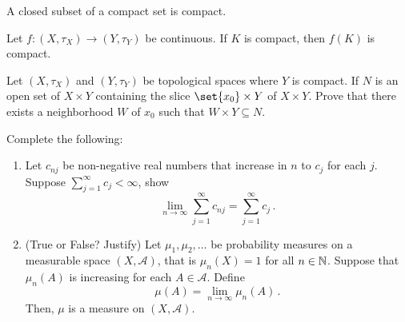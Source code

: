 \documentclass[12pt]{amsart}
\begin{document}
\begin{question}
	A closed subset of a compact set is compact.
\end{question}
\newpage

\begin{question}
	Let $f: (X, \tau_X) \to (Y, \tau_Y)$ be continuous.
	If $K$ is compact, then $f(K)$ is compact.
\end{question}

\newpage
\begin{question}[20 points]
	Let $(X, \tau_X)$ and $(Y, \tau_Y)$ be topological spaces where $Y$ is compact.
	If $N$ is an open set of $X\times Y$ containing the slice $\set{x_0} \times Y$ of $X \times Y$.
	Prove that there exists a neighborhood $W$ of $x_0$ such that $W\times Y \subseteq N$.
\end{question}

\newpage
\begin{question}[20 points] Complete the following:
	\begin{enumerate}
		\item Let $c_{nj}$ be non-negative real numbers that increase in $n$ to $c_j$ for each $j$.
		      Suppose $\sum_{j=1}^\infty c_j < \infty$, show
		      \begin{equation*}
			      \lim_{n\to \infty} \sum_{j=1}^\infty c_{nj} = \sum_{j=1}^\infty c_j \,.
		      \end{equation*}

		\item (True or False? Justify)
		      Let $\mu_1, \mu_2, \dots$ be probability measures
		      on a measurable space $(X, \mathcal{A})$, that is $\mu_n (X) = 1$ for all $n \in \mathbb{N}$.
		      Suppose that $\mu_n (A)$ is increasing for each $A \in \mathcal{A}$.
		      Define
		      \begin{equation*}
			      \mu(A) = \lim_{n\to \infty} \mu_n(A) \,.
		      \end{equation*}
		      Then, $\mu$ is a measure on $(X, \mathcal{A})$.
	\end{enumerate}
\end{question}
\end{document}
